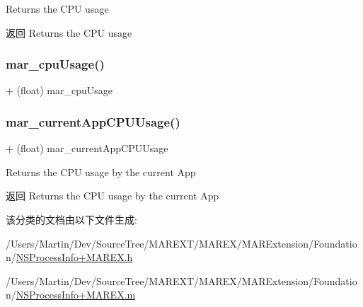 Returns the C\+PU usage

\begin{DoxyReturn}{返回}
Returns the C\+PU usage 
\end{DoxyReturn}
\mbox{\label{category_n_s_process_info_07_m_a_r_e_x_08_a822d28bc395bb8cfab378612a99a4aa4}} 
\subsubsection{\texorpdfstring{mar\+\_\+cpu\+Usage()}{mar\_cpuUsage()}}
{\footnotesize\ttfamily + (float) mar\+\_\+cpu\+Usage \begin{DoxyParamCaption}{ }\end{DoxyParamCaption}\hspace{0.3cm}{\ttfamily [implementation]}}

\mbox{\label{category_n_s_process_info_07_m_a_r_e_x_08_a4ef18cdfec3c496ffc5d95c44d472281}} 
\subsubsection{\texorpdfstring{mar\+\_\+current\+App\+C\+P\+U\+Usage()}{mar\_currentAppCPUUsage()}}
{\footnotesize\ttfamily + (float) mar\+\_\+current\+App\+C\+P\+U\+Usage \begin{DoxyParamCaption}{ }\end{DoxyParamCaption}}

Returns the C\+PU usage by the current App

\begin{DoxyReturn}{返回}
Returns the C\+PU usage by the current App 
\end{DoxyReturn}


该分类的文档由以下文件生成\+:\begin{DoxyCompactItemize}
\item 
/\+Users/\+Martin/\+Dev/\+Source\+Tree/\+M\+A\+R\+E\+X\+T/\+M\+A\+R\+E\+X/\+M\+A\+R\+Extension/\+Foundation/\hyperlink{_n_s_process_info_09_m_a_r_e_x_8h}{N\+S\+Process\+Info+\+M\+A\+R\+E\+X.\+h}\item 
/\+Users/\+Martin/\+Dev/\+Source\+Tree/\+M\+A\+R\+E\+X\+T/\+M\+A\+R\+E\+X/\+M\+A\+R\+Extension/\+Foundation/\hyperlink{_n_s_process_info_09_m_a_r_e_x_8m}{N\+S\+Process\+Info+\+M\+A\+R\+E\+X.\+m}\end{DoxyCompactItemize}
